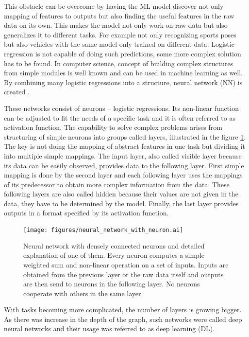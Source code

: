 This obstacle can be overcome by having the ML model discover not only mapping of features to outputs but also finding the useful features in the raw data on its own. This makes the model not only work on raw data but also generalizes it to different tasks. For example not only recognizing sports poses but also vehicles with the same model only trained on different data. Logistic regression is not capable of doing such predictions, some more complex solution has to be found. In computer science, concept of building complex structures from simple modules is well known and can be used in machine learning as well. By combining many logistic regressions into a structure, neural network (NN) is created \cite{Goodfellow-et-al-2016}.

These networks consist of neurons -- logistic regressions. Its non-linear function can be adjusted to fit the needs of a specific task and it is often referred to as activation function. The capability to solve complex problems arises from structuring of simple neurons into groups called layers, illustrated in the figure \ref{fig:network-with-neuron}. The key is not doing the mapping of abstract features in one task but dividing it into multiple simple mappings. The input layer, also called visible layer because its data can be easily observed, provides data to the following layer. First simple mapping is done by the second layer and each following layer uses the mappings of its predecessor to obtain more complex information from the data. These following layers are also called hidden because their values are not given in the data, they have to be determined by the model. Finally, the last layer provides outputs in a format specified by its activation function.

\begin{figure}[ht]\centering
    \label{fig:network-with-neuron}
    \centering
    \texttt{[image: figures/neural\_network\_with\_neuron.ai]}
    \caption{Neural network with densely connected neurons and detailed explanation of one of them. Every neuron computes a simple weighted sum and non-linear operation on a set of inputs. Inputs are obtained from the previous layer or the raw data itself and outputs are then send to neurons in the following layer. No neurons cooperate with others in the same layer.}
\end{figure}

With tasks becoming more complicated, the number of layers is growing bigger. As there was increase in the depth of the graph, such networks were called deep neural networks and their usage was referred to as deep learning (DL).

